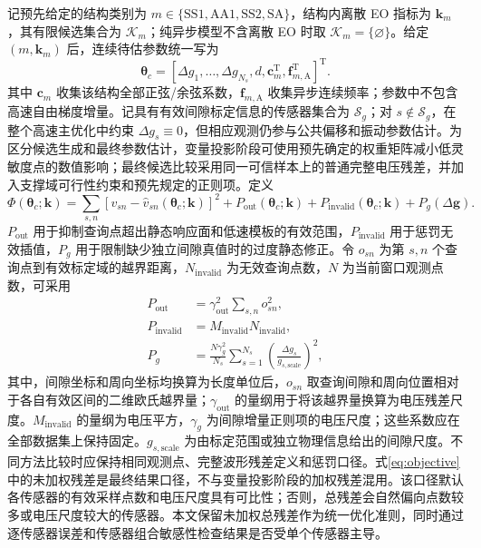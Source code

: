 \documentclass[UTF8,12pt,a4paper]{ctexart}
\begin{document}
记预先给定的结构类别为 $m\in\{\mathrm{SS1},\mathrm{AA1},\mathrm{SS2},\mathrm{SA}\}$，结构内离散 EO 指标为 $\bm k_m$，其有限候选集合为 $\mathcal K_m$；纯异步模型不含离散 EO 时取 $\mathcal K_m=\{\varnothing\}$。给定 $(m,\bm k_m)$ 后，连续待估参数统一写为
\begin{equation}
\bm\theta_c=
\left[
\Delta g_1,\ldots,\Delta g_{N_s},d,
\bm c_m^{\mathrm T},\bm f_{m,\mathrm A}^{\mathrm T}
\right]^{\mathrm T}.
\label{eq:theta}
\end{equation}
其中 $\bm c_m$ 收集该结构全部正弦/余弦系数，$\bm f_{m,\mathrm A}$ 收集异步连续频率；参数中不包含高速自由梯度增量。记具有有效间隙标定信息的传感器集合为 $\mathcal S_g$；对 $s\notin\mathcal S_g$，在整个高速主优化中约束 $\Delta g_s\equiv0$，但相应观测仍参与公共偏移和振动参数估计。为区分候选生成和最终参数估计，变量投影阶段可使用预先确定的权重矩阵减小低灵敏度点的数值影响；最终候选比较采用同一可信样本上的普通完整电压残差，并加入支撑域可行性约束和预先规定的正则项。定义
\begin{equation}
\Phi(\bm\theta_c;\bm k)=
\sum_{s,n}
\left[v_{sn}-\widehat v_{sn}(\bm\theta_c;\bm k)\right]^2
+P_{\mathrm{out}}(\bm\theta_c;\bm k)
+P_{\mathrm{invalid}}(\bm\theta_c;\bm k)
+P_g(\Delta\bm g).
\label{eq:objective}
\end{equation}
$P_{\mathrm{out}}$ 用于抑制查询点超出静态响应面和低速模板的有效范围，$P_{\mathrm{invalid}}$ 用于惩罚无效插值，$P_g$ 用于限制缺少独立间隙真值时的过度静态修正。令 $o_{sn}$ 为第 $s,n$ 个查询点到有效标定域的越界距离，$N_{\mathrm{invalid}}$ 为无效查询点数，$N$ 为当前窗口观测点数，可采用
\begin{equation}
\begin{aligned}
P_{\mathrm{out}}&=\gamma_{\mathrm{out}}^2\sum_{s,n}o_{sn}^2,\\
P_{\mathrm{invalid}}&=M_{\mathrm{invalid}}N_{\mathrm{invalid}},\\
P_g&=
\frac{N\gamma_g^2}{N_s}
\sum_{s=1}^{N_s}
\left(\frac{\Delta g_s}{g_{s,\mathrm{scale}}}\right)^2,
\end{aligned}
\label{eq:penalties}
\end{equation}
其中，间隙坐标和周向坐标均换算为长度单位后，$o_{sn}$ 取查询间隙和周向位置相对于各自有效区间的二维欧氏越界量；$\gamma_{\mathrm{out}}$ 的量纲用于将该越界量换算为电压残差尺度。$M_{\mathrm{invalid}}$ 的量纲为电压平方，$\gamma_g$ 为间隙增量正则项的电压尺度；这些系数应在全部数据集上保持固定。$g_{s,\mathrm{scale}}$ 为由标定范围或独立物理信息给出的间隙尺度。不同方法比较时应保持相同观测点、完整波形残差定义和惩罚口径。式\eqref{eq:objective}中的未加权残差是最终结果口径，不与变量投影阶段的加权残差混用。该口径默认各传感器的有效采样点数和电压尺度具有可比性；否则，总残差会自然偏向点数较多或电压尺度较大的传感器。本文保留未加权总残差作为统一优化准则，同时通过逐传感器误差和传感器组合敏感性检查结果是否受单个传感器主导。
\end{document}
